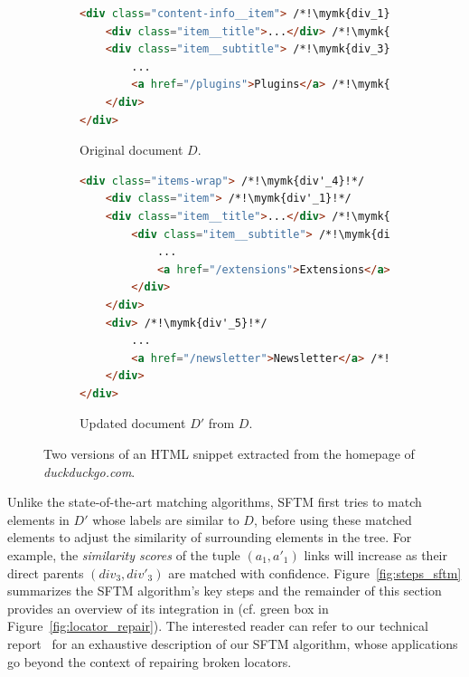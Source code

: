 \begin{figure}
    \centering
    \begin{subfigure}[b]{\linewidth}
        \centering
        \caption{Original document $D$.}
        \begin{lstlisting}[language=html, label={fig:first_version}]
<div class="content-info__item"> /*!\mymk{div_1}!*/
    <div class="item__title">...</div> /*!\mymk{div_2}!*/
    <div class="item__subtitle"> /*!\mymk{div_3}!*/
        ... 
        <a href="/plugins">Plugins</a> /*!\mymk{~a_1~}!*/
    </div>
</div>
        \end{lstlisting}
    \end{subfigure}
    \hfill
    \begin{subfigure}[b]{\linewidth}
        \centering
        \caption{Updated document $D'$ from $D$.}
        \begin{lstlisting}[language=html, label={fig:second_version}]
<div class="items-wrap"> /*!\mymk{div'_4}!*/
    <div class="item"> /*!\mymk{div'_1}!*/
    <div class="item__title">...</div> /*!\mymk{div'_2}!*/
        <div class="item__subtitle"> /*!\mymk{div'_3}!*/
            ... 
            <a href="/extensions">Extensions</a> /*!\mymk{~a'_1~}!*/
        </div>
    </div>
    <div> /*!\mymk{div'_5}!*/  
        ...
        <a href="/newsletter">Newsletter</a> /*!\mymk{~a'_2~}!*/
    </div>
</div>
        \end{lstlisting}
    \end{subfigure}
    \caption{Two versions of an HTML snippet extracted from the homepage of \emph{duckduckgo.com}.}
    \label{fig:example_html}
\end{figure}

Unlike the state-of-the-art matching algorithms, SFTM first tries to match elements in $D'$ whose labels are similar to $D$, before using these matched elements to adjust the similarity of surrounding elements in the tree.
For example, the \emph{similarity scores} of the tuple $(a_1,a'_1)$ links will increase as their direct parents $(div_3,div'_3)$ are matched with confidence.
% 
Figure~\ref{fig:steps_sftm} summarizes the SFTM algorithm's key steps and the remainder of this section provides an overview of its integration in \erratum{} (cf. green box in Figure~\ref{fig:locator_repair}).
The interested reader can refer to our technical report~\cite{brisset2020sftm} for an exhaustive description of our SFTM algorithm, whose applications go beyond the context of repairing broken locators.

